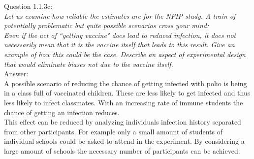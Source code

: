 
Question 1.1.3c:\\	
\textsl{Let us examine how reliable the estimates are for the NFIP study. A train of potentially problematic but quite possible scenarios cross your mind:\\Even if the act of “getting vaccine" does lead to reduced infection, it does not necessarily mean that it is the vaccine itself that leads to this result. Give an example of how this could be the case. Describe an aspect of experimental design that would eliminate biases not due to the vaccine itself. }\\

Answer:\\
A possible scenario of reducing the chance of getting infected with polio is being in a class full of vaccinated children. These are less likely to get infected and thus less likely to infect classmates. With an increasing rate of immune students the chance of getting an infection reduces.\\

This effect can be reduced by analyzing individuals infection history separated from other participants. For example only a small amount of students of individual schools could be asked to attend in the experiment. By considering a large amount of schools the necessary number of participants can be achieved.\\